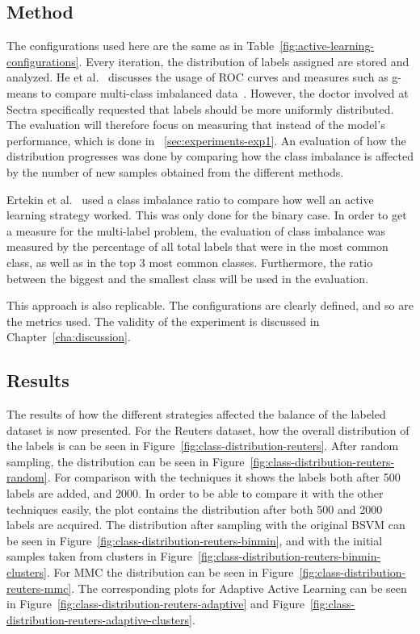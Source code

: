 \subsection{Method}

The configurations used here are the same as in Table~\ref{fig:active-learning-configurations}.
Every iteration, the distribution of labels assigned are stored and analyzed.
He et al\@.~\cite{he2009learning} discusses the usage of ROC curves and measures such as g-means to compare multi-class imbalanced data~\cite{he2009learning}.
However, the doctor involved at Sectra specifically requested that labels should be more uniformly distributed. 
The evaluation will therefore focus on measuring that instead of the model's performance, which is done in ~\ref{sec:experiments-exp1}.
An evaluation of how the distribution progresses was done by comparing how the class imbalance is affected by the number of new samples obtained from the different methods.

Ertekin et al\@.~\cite{ertekin2007learning} used a class imbalance ratio to compare how well an active learning strategy worked.
This was only done for the binary case.
In order to get a measure for the multi-label problem, the evaluation of class imbalance was measured by the percentage of all total labels that were in the most common class, as well as in the top 3 most common classes.
Furthermore, the ratio between the biggest and the smallest class will be used in the evaluation.

This approach is also replicable.
The configurations are clearly defined, and so are the metrics used.
The validity of the experiment is discussed in Chapter~\ref{cha:discussion}.

\subsection{Results}

The results of how the different strategies affected the balance of the labeled dataset is now presented.
For the Reuters dataset, how the overall distribution of the labels is can be seen in Figure~\ref{fig:class-distribution-reuters}.
After random sampling, the distribution can be seen in Figure~\ref{fig:class-distribution-reuters-random}.
For comparison with the techniques it shows the labels both after 500 labels are added, and 2000.
In order to be able to compare it with the other techniques easily, the plot contains the distribution after both 500 and 2000 labels are acquired.
The distribution after sampling with the original BSVM can be seen in Figure~\ref{fig:class-distribution-reuters-binmin}, and with the initial samples taken from clusters in Figure~\ref{fig:class-distribution-reuters-binmin-clusters}.
For MMC the distribution can be seen in Figure~\ref{fig:class-distribution-reuters-mmc}.
The corresponding plots for Adaptive Active Learning can be seen in Figure~\ref{fig:class-distribution-reuters-adaptive} and Figure~\ref{fig:class-distribution-reuters-adaptive-clusters}.


